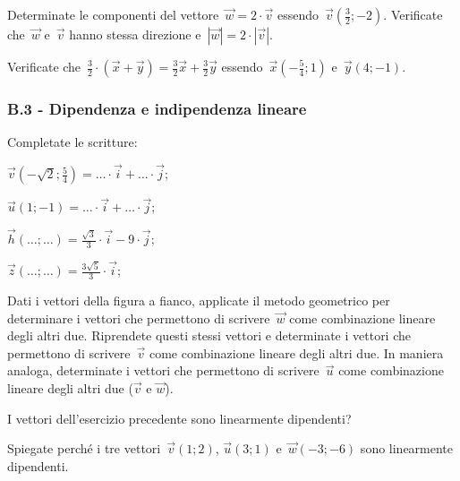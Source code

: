 \begin{esercizio}
\label{ese:B.5}
Determinate le componenti del vettore~$\vec{w}=2 \cdot \vec{v}$ essendo~$\vec{v}(\frac{3}{2};-2)$. Verificate che~$\vec{w}$ e~$\vec{v}$ hanno stessa direzione
e~$|\vec{w}|=2 \cdot |\vec{v}|$.
\end{esercizio}

\begin{esercizio}
\label{ese:B.6}
Verificate che~$\frac{3}{2} \cdot (\vec{x}+\vec{y})=\frac{3}{2}\vec{x}+\frac{3}{2}\vec{y}$ essendo~$\vec{x}(-\frac{5}{4};1)$ e~$\vec{y}(4;-1)$.
\end{esercizio}
\pagebreak
\subsubsection*{B.3 - Dipendenza e indipendenza lineare}
\begin{esercizio}
\label{ese:B.7}
Completate le scritture:
\begin{multicols}{2}
\begin{enumeratea}
\item $\vec{v}(-\sqrt{2};\frac {5}{4})=\ldots \cdot \vec{i}+\ldots \cdot \vec{j}$;
\item $\vec{u}(1;-1)=\ldots \cdot \vec{i}+\ldots \cdot \vec{j}$;
\item $\vec{h}(\ldots;\ldots)=\frac {\sqrt{3}}{3} \cdot \vec{i}-9 \cdot \vec{j}$;
\item $\vec{z}(\ldots;\ldots)=\frac {3 \sqrt{5}}{3} \cdot \vec{i}$;
\end{enumeratea}
\end{multicols}
\end{esercizio}

\begin{esercizio}
\label{ese:B.8}
\begin{multicols}{2}
 Dati i vettori della figura a fianco, applicate il metodo geometrico per determinare i vettori che permettono di scrivere~$\vec{w}$ come combinazione lineare degli altri due.
Riprendete questi stessi vettori e determinate i vettori che permettono di scrivere~$\vec{v}$ come combinazione lineare degli altri due. In maniera analoga, determinate i vettori che permettono di scrivere~$\vec{u}$ come combinazione lineare degli altri due ($\vec{v}$ e $\vec{w}$).
\begin{center}

\end{center}
\end{multicols}
\end{esercizio}

\begin{esercizio}
\label{ese:B.9}
I vettori dell'esercizio precedente sono linearmente dipendenti?
\end{esercizio}

\begin{esercizio}
\label{ese:B.10}
Spiegate perché i tre vettori~$\vec{v}(1;2)$, $\vec{u}(3;1)$ e~$\vec{w}(-3;-6)$ sono linearmente dipendenti.
\end{esercizio}

